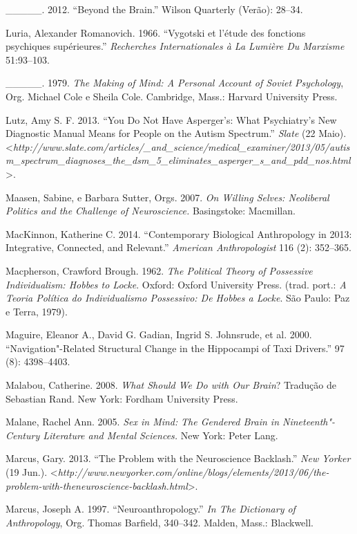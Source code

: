 {\begin{Parskip}
\_\_\_\_\_. 2012. ``Beyond the Brain.'' Wilson Quarterly (Verão): 28--34.

Luria, Alexander Romanovich. 1966. ``Vygotski et l'étude des fonctions
psychiques supérieures.'' \emph{Recherches Internationales à La Lumière
Du Marxisme} 51:93--103.

\_\_\_\_\_. 1979. \emph{The Making of Mind: A Personal Account of Soviet
Psychology}, Org. Michael Cole e Sheila Cole. Cambridge, Mass.: Harvard
University Press.

Lutz, Amy S. F. 2013. ``You Do Not Have Asperger's: What Psychiatry's
New Diagnostic Manual Means for People on the Autism Spectrum.''
\emph{Slate} (22 Maio).
\textless{}\emph{http://www.slate.com/articles/\_and\_science/medical\_examiner/2013/05/autism\_spectrum\_diagnoses\_the\_dsm\_5\_eliminates\_asperger\_s\_and\_pdd\_nos.html}\textgreater{}.

Maasen, Sabine, e Barbara Sutter, Orgs. 2007. \emph{On Willing Selves:
Neoliberal Politics and the Challenge of Neuroscience.} Basingstoke:
Macmillan.

MacKinnon, Katherine C. 2014. ``Contemporary Biological Anthropology in
2013: Integrative, Connected, and Relevant.'' \emph{American
Anthropologist} 116 (2): 352--365.

Macpherson, Crawford Brough. 1962. \emph{The Political Theory of
Possessive Individualism: Hobbes to Locke}. Oxford: Oxford University
Press. (trad. port.: \emph{A Teoria Política do Individualismo
Possessivo: De Hobbes a Locke}. São Paulo: Paz e Terra, 1979).

Maguire, Eleanor A., David G. Gadian, Ingrid S. Johnsrude, et al. 2000.
``Navigation"-Related Structural Change in the Hippocampi of Taxi
Drivers.'' \emph{} 97 (8): 4398--4403.

Malabou, Catherine. 2008. \emph{What Should We Do with Our Brain}?
Tradução de Sebastian Rand. New York: Fordham University Press.

Malane, Rachel Ann. 2005. \emph{Sex in Mind:} \emph{The Gendered Brain
in Nineteenth"-Century Literature and Mental Sciences.} New York: Peter
Lang.

Marcus, Gary. 2013. ``The Problem with the Neuroscience Backlash.''
\emph{New Yorker} (19 Jun.).
\textless{}\emph{http://www.newyorker.com/online/blogs/elements/2013/06/the-problem-with-theneuroscience-backlash.html}\textgreater{}.

Marcus, Joseph A. 1997. ``Neuroanthropology.'' \emph{In The Dictionary
of Anthropology}, Org. Thomas Barfield, 340--342. Malden, Mass.:
Blackwell.


\end{Parskip}}

